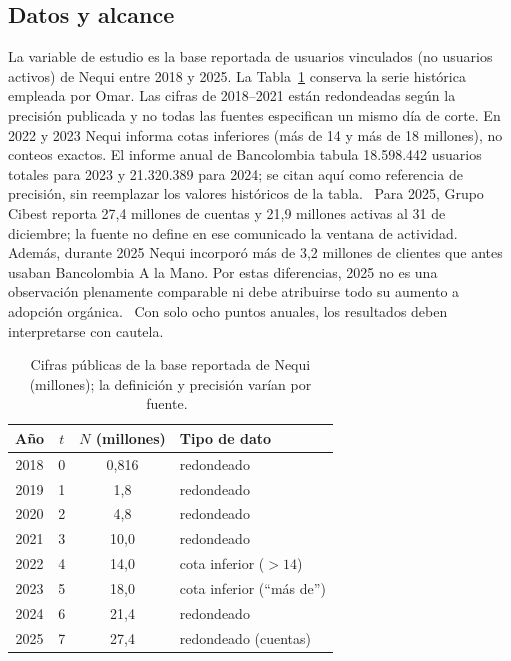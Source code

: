 \documentclass[12pt,a4paper]{article}
\begin{document}
\subsection{Datos y alcance}
La variable de estudio es la base reportada de usuarios vinculados (no usuarios activos) de Nequi entre 2018 y 2025. La Tabla~\ref{tab:datos} conserva la serie histórica empleada por Omar. Las cifras de 2018--2021 están redondeadas según la precisión publicada y no todas las fuentes especifican un mismo día de corte. En 2022 y 2023 Nequi informa cotas inferiores (más de 14 y más de 18 millones), no conteos exactos. El informe anual de Bancolombia tabula 18.598.442 usuarios totales para 2023 y 21.320.389 para 2024; se citan aquí como referencia de precisión, sin reemplazar los valores históricos de la tabla.~\cite{bancolombia2024sec} Para 2025, Grupo Cibest reporta 27,4 millones de cuentas y 21,9 millones activas al 31 de diciembre; la fuente no define en ese comunicado la ventana de actividad. Además, durante 2025 Nequi incorporó más de 3,2 millones de clientes que antes usaban Bancolombia A la Mano. Por estas diferencias, 2025 no es una observación plenamente comparable ni debe atribuirse todo su aumento a adopción orgánica.~\cite{cibest4t25,cibestannual2025} Con solo ocho puntos anuales, los resultados deben interpretarse con cautela.

\begin{table}[h]
\centering
\caption{Cifras públicas de la base reportada de Nequi (millones); la definición y precisión varían por fuente.~\cite{nequi_6anos,nequi_somos,bancolombia4t24,bancolombia2024sec,elcolombiano2025,cibest4t25}}
\label{tab:datos}
\begin{tabular}{cccl}
\toprule
A\~no & $t$ & $N$ (millones) & Tipo de dato \\
\midrule
2018 & 0 & 0{,}816 & redondeado \\
2019 & 1 & 1{,}8   & redondeado \\
2020 & 2 & 4{,}8   & redondeado \\
2021 & 3 & 10{,}0  & redondeado \\
2022 & 4 & 14{,}0  & cota inferior ($>14$) \\
2023 & 5 & 18{,}0  & cota inferior (``m\'as de'') \\
2024 & 6 & 21{,}4  & redondeado \\
2025 & 7 & 27{,}4  & redondeado (cuentas) \\
\bottomrule
\end{tabular}
\end{table}
\end{document}
